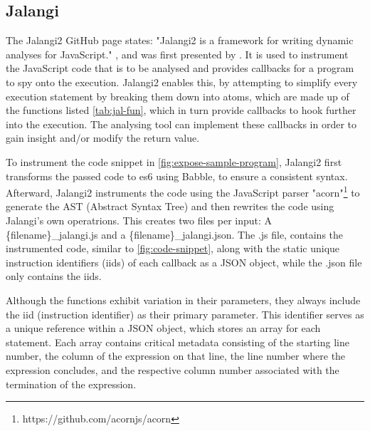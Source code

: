 \subsection{Jalangi}
\label{sec:jalangi}
The Jalangi2 GitHub page \cite{noauthor_samsungjalangi2_nodate} states: "Jalangi2 is a framework for writing dynamic analyses for JavaScript." , and was first presented by \citet{sen_jalangi_2013}. It is used to instrument the JavaScript code that is to be analysed and provides callbacks for a program to spy onto the execution.
Jalangi2 enables this, by attempting to simplify every execution statement by breaking them down into atoms, which are made up of the functions listed \autoref{tab:jal-fun}, which in turn provide callbacks to hook further into the execution.
The analysing tool can implement these callbacks in order to gain insight and/or modify the return value.


To instrument the code snippet in \autoref{fig:expose-sample-program}, Jalangi2 first transforms the passed code to es6 using Babble, to ensure a consistent syntax. 
Afterward, Jalangi2 instruments the code using the JavaScript parser "acorn"\footnote{https://github.com/acornjs/acorn} to generate the AST (Abstract Syntax Tree) and then rewrites the code using Jalangi's own operatrions. This creates two files per input: 
A \{filename\}\_jalangi.js and a \{filename\}\_jalangi.json. The .js file, contains the instrumented code, similar to \autoref{fig:code-snippet}, along with the static unique instruction identifiers (iids) of each callback as a JSON object, while the .json file only contains the iids.

Although the functions exhibit variation in their parameters, they always include the iid (instruction identifier) as their primary parameter. This identifier serves as a unique reference within a JSON object, which stores an array for each statement. Each array contains critical metadata consisting of the starting line number, the column of the expression on that line, the line number where the expression concludes, and the respective column number associated with the termination of the expression.



